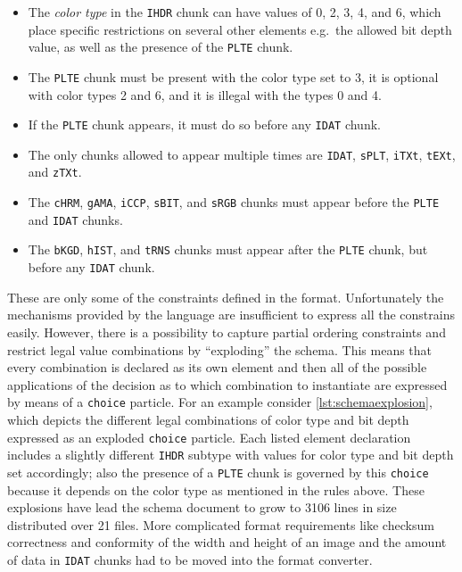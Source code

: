 \begin{itemize}
\item[] The \emph{color type} in the \texttt{IHDR} chunk can have values of 0, 2, 3, 4, and 6, which place
specific restrictions on several other elements e.g.\ the allowed bit depth value, as well as the presence of
the \texttt{PLTE} chunk.

\item[] The \texttt{PLTE} chunk must be present with the color type set to 3, it is optional with color types 2
and 6, and it is illegal with the types 0 and 4.

\item[] If the \texttt{PLTE} chunk appears, it must do so before any \texttt{IDAT} chunk.

\item[] The only chunks allowed to appear multiple times are \texttt{IDAT}, \texttt{sPLT}, \texttt{iTXt},
\texttt{tEXt}, and \texttt{zTXt}.

\item[] The \texttt{cHRM}, \texttt{gAMA}, \texttt{iCCP}, \texttt{sBIT}, and \texttt{sRGB} chunks must appear
before the \texttt{PLTE} and \texttt{IDAT} chunks.

\item[] The \texttt{bKGD}, \texttt{hIST}, and \texttt{tRNS} chunks must appear after the \texttt{PLTE} chunk,
but before any \texttt{IDAT} chunk.
\end{itemize}

These are only some of the constraints defined in the \png format. Unfortunately the mechanisms provided by
the \xsd language are insufficient to express all the constrains easily. However, there is a possibility to
capture partial ordering constraints and restrict legal value combinations by ``exploding'' the schema. This
means that every combination is declared as its own element and then all of the possible applications of the
decision as to which combination to instantiate are expressed by means of a \texttt{choice} particle.
For an example consider \cref{lst:schemaexplosion}, which depicts the different legal combinations of color
type and bit depth expressed as an exploded \texttt{choice} particle. Each listed element declaration includes
a slightly different \texttt{IHDR} subtype with values for color type and bit depth set accordingly; also the
presence of a \texttt{PLTE} chunk is governed by this \texttt{choice} because it depends on the color type as
mentioned in the rules above. These explosions have lead the schema document to grow to 3106 lines in size
distributed over 21 files. More complicated format requirements like checksum correctness and conformity of
the width and height of an image and the amount of data in \texttt{IDAT} chunks had to be moved into the format
converter.

